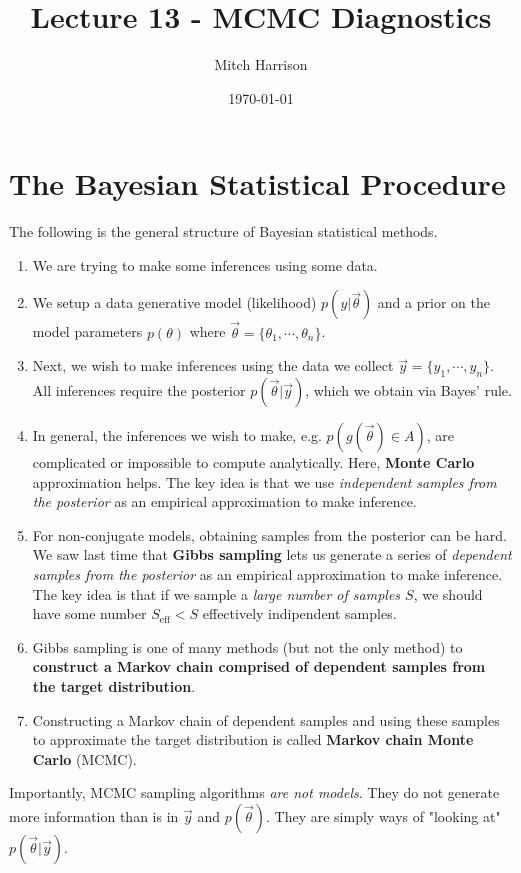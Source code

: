 \documentclass[titlepage, 12pt, leqno]{article}
\title{\Huge{Lecture 13 - MCMC Diagnostics}}
\author{\large{Mitch Harrison}}
\date{\today}
\begin{document}
\setlength{\parskip}{1\baselineskip}
\setlength{\parindent}{15pt}
\maketitle
\tableofcontents
\newpage


\section{The Bayesian Statistical Procedure}

The following is the general structure of Bayesian statistical methods.
\begin{enumerate}
    \item We are trying to make some inferences using some data.
    \item We setup a data generative model (likelihood) $p(y|\vec\theta)$ and a
        prior on the model parameters $p(\theta)$ where $\vec \theta = 
        \{\theta_{1}, \cdots ,\theta_{n}\}$.
    \item Next, we wish to make inferences using the data we collect $\vec y =
        \{y_{1}, \cdots , y_{n}\}$. All inferences require the posterior
        $p(\vec \theta|\vec y)$, which we obtain via Bayes' rule.
    \item In general, the inferences we wish to make, e.g. $p(g(\vec \theta)
        \in A)$, are complicated or impossible to compute analytically. Here,
        \textbf{Monte Carlo} approximation helps. The key idea is that we use
        \textit{independent samples from the posterior} as an empirical 
        approximation to make inference.
    \item For non-conjugate models, obtaining samples from the posterior can be
        hard. We saw last time that \textbf{Gibbs sampling} lets us generate a
        series of \textit{dependent samples from the posterior} as an empirical
        approximation to make inference. The key idea is that if we sample a
        \textit{large number of samples $S$}, we should have some number
        $S_{ \text{eff}}<S$ effectively indipendent samples.
    \item Gibbs sampling is one of many methods (but not the only method) to
        \textbf{construct a Markov chain comprised of dependent samples from
        the target distribution}.
    \item Constructing a Markov chain of dependent samples and using these
        samples to approximate the target distribution is called \textbf{Markov
        chain Monte Carlo} (MCMC).
\end{enumerate}
Importantly, MCMC sampling algorithms \textit{are not models}. They do not
generate more information than is in $\vec y$ and $p(\vec \theta)$. They are
simply ways of "looking at" $p(\vec \theta|\vec y)$.
\end{document}
